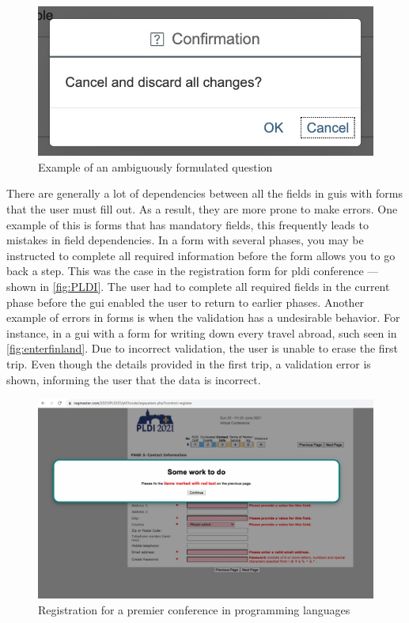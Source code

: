 \begin{figure}
    \centering
    \includegraphics[scale=0.65]{figures/DFO.jpg}
    \caption{Example of an ambiguously formulated question}
    \label{fig:DFO}
\end{figure}

There are generally a lot of dependencies between all the fields in \gls{gui}s with forms that the user must fill out. As a result, they are more prone to make errors. One example of this is forms that has mandatory fields, this frequently leads to mistakes in field dependencies. In a form with several phases, you may be instructed to complete all required information before the form allows you to go back a step. This was the case in the registration form for \gls{pldi} conference --- shown in \autoref{fig:PLDI}. The user had to complete all required fields in the current phase before the \gls{gui} enabled the user to return to earlier phases. 
Another example of errors in forms is when the validation has a undesirable behavior. For instance, in a \gls{gui} with a form for writing down every travel abroad, such seen in \autoref{fig:enterfinland}. Due to incorrect validation, the user is unable to erase the first trip. Even though the details provided in the first trip, a validation error is shown, informing the user that the data is incorrect.
\begin{figure}
    \centering
    \includegraphics[scale=0.2]{figures/PLDI.jpg}
    \caption{Registration for a premier conference in programming languages}
    \label{fig:PLDI}
\end{figure}


